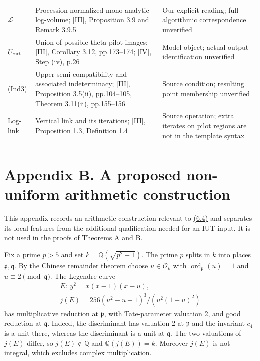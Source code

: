 \documentclass[11pt,a4paper]{amsart}
\begin{document}
{\begin{longtable}{@{}P{0.2\textwidth}P{0.44\textwidth}P{0.29\textwidth}@{}}
$\mathcal L$ & Procession-normalized mono-analytic log-volume; [III], Proposition 3.9 and Remark 3.9.5 & Our explicit reading; full algorithmic correspondence unverified\\\addlinespace[3pt]
$U_{\rm out}$ & Union of possible theta-pilot images; [III], Corollary 3.12, pp.173--174; [IV], Step (iv), p.26 & Model object; actual-output identification unverified\\\addlinespace[3pt]
(Ind3) & Upper semi-compatibility and associated indeterminacy; [III], Proposition 3.5(ii), pp.104--105, Theorem 3.11(ii), pp.155--156 & Source condition; resulting point membership unverified\\\addlinespace[3pt]
Log-link & Vertical link and its iterations; [III], Proposition 1.3, Definition 1.4 & Source operation; extra iterates on pilot regions are not in the template syntax\\\addlinespace[3pt]
\end{longtable}
}

\section*{Appendix B. A proposed non-uniform arithmetic construction}

This appendix records an arithmetic construction relevant to \hyperref[eq:6.4]{(6.4)} and separates its local features from the additional qualification needed for an IUT input. It is not used in the proofs of Theorems A and B.


Fix a prime $p>5$ and set $k=\mathbb Q(\sqrt{p^2+1})$. The prime $p$ splits in $k$ into places $\mathfrak p,\mathfrak q$. By the Chinese remainder theorem choose $u\in\mathcal O_k$ with $\operatorname{ord}_{\mathfrak p}(u)=1$ and $u\equiv2\pmod{\mathfrak q}$. The Legendre curve
\begin{equation}
\begin{gathered}
E:\ y^2=x(x-1)(x-u),\\
j(E)=256(u^2-u+1)^3/(u^2(1-u)^2)
\end{gathered}
\tag{B.1}\label{eq:B.1}
\end{equation}
has multiplicative reduction at $\mathfrak p$, with Tate-parameter valuation 2, and good reduction at $\mathfrak q$. Indeed, the discriminant has valuation 2 at $\mathfrak p$ and the invariant $c_4$ is a unit there, whereas the discriminant is a unit at $\mathfrak q$. The two valuations of $j(E)$ differ, so $j(E)\notin\mathbb Q$ and $\mathbb Q(j(E))=k$. Moreover $j(E)$ is not integral, which excludes complex multiplication.
\end{document}
